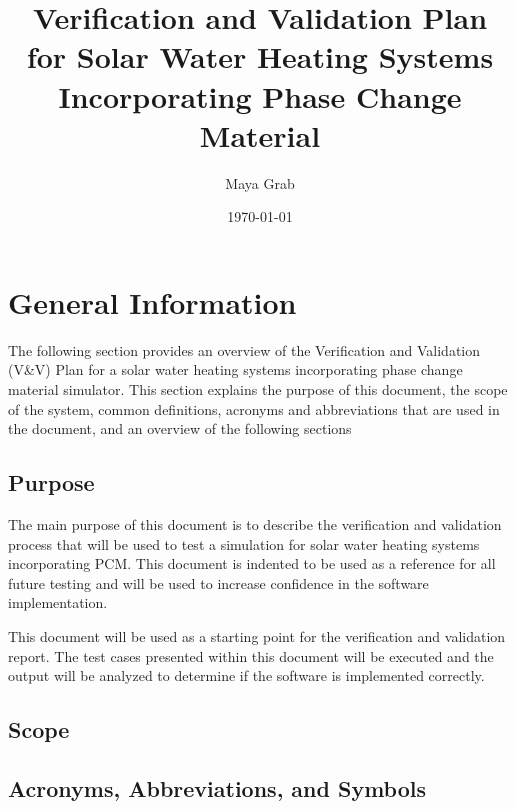 \documentclass[12pt]{article}
\begin{document}
\title{Verification and Validation Plan for Solar Water Heating Systems Incorporating 
Phase Change Material} 
\author{Maya Grab}
\date{\today}
	
\maketitle

\tableofcontents

%
%

\section{General Information}
The following section provides an overview of the Verification and Validation (V\&V) Plan 
for a solar water heating systems incorporating phase change material simulator.
 This section explains the purpose of this document, the scope of the system,
  common definitions, acronyms and abbreviations that are used in the document,
   and an overview of the following sections

\subsection{Purpose}
The main purpose of this document is to describe the verification and validation 
process that will be used to test a simulation for solar water heating systems incorporating PCM.
This document is indented to be used as a reference for all future testing and will
be used to increase confidence in the software implementation.  

This document will be used as a starting point for the verification and validation report. The 
test cases presented within this document will be executed and the output will be analyzed to 
determine if the software is implemented correctly.  


\subsection{Scope}


\subsection{Acronyms, Abbreviations, and Symbols }
\end{document}
